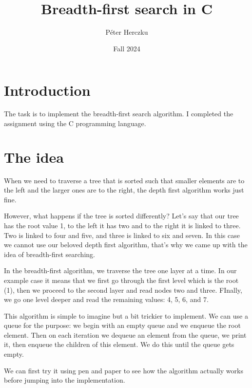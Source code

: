 \documentclass[a4paper,11pt]{article}
\begin{document}
    \title{
        \textbf{Breadth-first search in C}
    }
    \author{Péter Herczku}
    \date{Fall 2024}

    \maketitle

    \section*{Introduction}

    The task is to implement the breadth-first search algorithm. 
    I completed the assignment using the C programming language.

    \section*{The idea}

    When we need to traverse a tree that is sorted such that smaller elements are to the left and the larger ones are to the right, the depth first algorithm works just fine.
    
    However, what happens if the tree is sorted differently?
    Let's say that our tree has the root value 1, to the left it has two and to the right it is linked to three. Two is linked to four and five, and three is linked to six and seven.
    In this case we cannot use our beloved depth first algorithm, that's why we came up with the idea of breadth-first searching.

    In the breadth-first algorithm, we traverse the tree one layer at a time.
    In our example case it means that we first go through the first level which is the root (1), then we proceed to the second layer and read nodes two and three.
    FInally, we go one level deeper and read the remaining values: 4, 5, 6, and 7.

    This algorithm is simple to imagine but a bit trickier to implement.
    We can use a queue for the purpose: we begin with an empty queue and we enqueue the root element.
    Then on each iteration we dequeue an element from the queue, we print it, then enqueue the children of this element.
    We do this until the queue gets empty.

    We can first try it using pen and paper to see how the algorithm actually works before jumping into the implementation.
\end{document}

